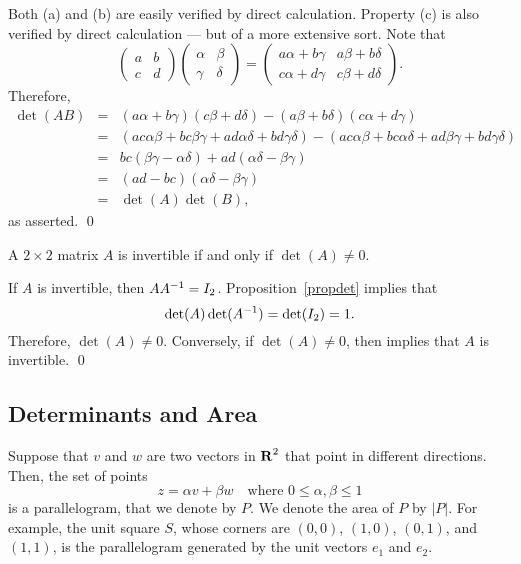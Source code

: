 \proof Both (a) and (b) are easily verified by direct
calculation.  Property (c) is also verified by direct
calculation --- but of a more extensive sort.  Note that
\[
\left(\begin{array}{cc} a & b\\ c & d \end{array}\right)
\left(\begin{array}{cc} \alpha & \beta \\ \gamma & \delta
\end{array}\right) =
\left(\begin{array}{cc} a\alpha+b\gamma & a\beta+b\delta \\
c\alpha+d\gamma & c\beta+d\delta\end{array}\right).
\]
Therefore,
\begin{eqnarray*}
\det(AB) & = & (a\alpha+b\gamma)(c\beta+d\delta) -
     (a\beta+b\delta)(c\alpha+d\gamma)\\
& = & (ac\alpha\beta+bc\beta\gamma+ad\alpha\delta+bd\gamma\delta)
-(ac\alpha\beta+bc\alpha\delta+ad\beta\gamma+bd\gamma\delta)\\
& = & bc(\beta\gamma-\alpha\delta) +
ad(\alpha\delta-\beta\gamma) \\
& = & (ad-bc)(\alpha\delta-\beta\gamma) \\
& = & \det(A)\det(B),
\end{eqnarray*}
as asserted.   \qed

\begin{cor}  \label{C:2x2invert} 
A $2\times 2$ matrix $A$ is invertible if and only if $\det(A)\neq 0$.
\end{cor}

\proof  If $A$ is invertible, then $AA^{-1} = I_2$.
Proposition~\ref{propdet} implies that
\[
\det(A)\det(A^{-1}) = \det(I_2) = 1.
\]
Therefore, $\det(A)\neq 0$.  Conversely, if $\det(A)\neq 0$, then
 implies that $A$ is invertible.  \qed


\subsection*{Determinants and Area}

Suppose that $v$ and $w$ are two vectors in $\mbox{$\bf{R}$}^2$ that point in different
directions.  Then, the set of points
\[
z=\alpha v + \beta w \quad\mbox{where } 0\leq\alpha,\beta\leq 1
\]
is a parallelogram, that we denote by $P$.
We denote the area of $P$ by $|P|$.  For example, the unit square $S$, whose
corners are $(0,0)$, $(1,0)$, $(0,1)$, and $(1,1)$, is the parallelogram
generated by the unit vectors $e_1$ and $e_2$.

